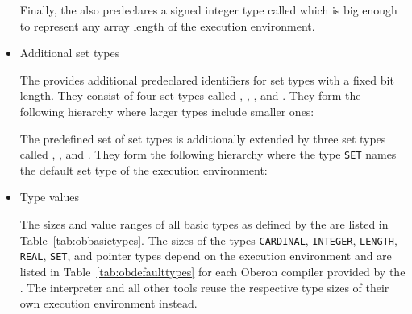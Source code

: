 \begin{itemize}

Finally, the \ecs{} also predeclares a signed integer type called \texttt{} which is big enough to represent any array length of the execution environment.

\item Additional set types

The \ecs{} provides additional predeclared identifiers for set types with a fixed bit length.
They consist of four set types called \texttt{}, \texttt{}, \texttt{}, and \texttt{}.
They form the following hierarchy where larger types include smaller ones:


The predefined set of set types is additionally extended by three set types called \texttt{}, \texttt{}, and \texttt{}.
They form the following hierarchy where the type \texttt{SET} names the default set type of the execution environment:


\item Type values

The sizes and value ranges of all basic types as defined by the \ecs{} are listed in Table~\ref{tab:obbasictypes}.
The sizes of the types \texttt{CARDINAL}, \texttt{INTEGER}, \texttt{LENGTH}, \texttt{REAL}, \texttt{SET}, and pointer types depend on the execution environment and are listed in Table~\ref{tab:obdefaulttypes} for each Oberon compiler provided by the \ecs{}.
The interpreter and all other tools reuse the respective type sizes of their own execution environment instead.


\end{itemize}
